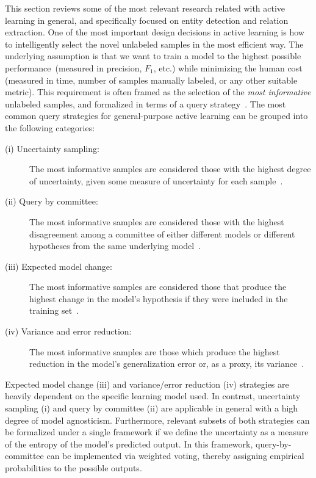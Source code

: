 This section reviews some of the most relevant research related with active learning in general, and specifically focused on entity detection and relation extraction.
One of the most important design decisions in active learning is how to intelligently select the novel unlabeled samples in the most efficient way. The underlying assumption is that we want to train a
model to the highest possible performance~(measured in precision, $F_1$, etc.) while minimizing the human cost (measured in time, number of samples manually labeled, or any other suitable metric).
This requirement is often framed as the selection of the \textit{most informative} unlabeled samples, and formalized in terms of a query strategy~\cite{survey}.
The most common query strategies for general-purpose active learning can be grouped into the following categories:

\begin{description}
\item[(i) Uncertainty sampling:] The most informative samples are considered those with the highest degree of uncertainty, given some measure of uncertainty for each sample~\cite{Lewis1994148}.

\item[(ii) Query by committee:] The most informative samples are considered those with the highest disagreement among a committee of either different models or different hypotheses from the same underlying model~\cite{seungquery}.

\item[(iii) Expected model change:] The most informative samples are considered those that produce the highest change in the model's hypothesis if they were included in the training set~\cite{NIPS2007_3252}.

\item[(iv) Variance and error reduction:] The most informative samples are those which produce the highest reduction in the model's generalization error or, as a proxy, its variance~\cite{roy2001toward}.
\end{description}

Expected model change (iii) and variance/error reduction (iv) strategies are heavily dependent on the specific learning model used.
In contrast, uncertainty sampling (i) and query by committee (ii) are  applicable in general with a high degree of model agnosticism.
Furthermore, relevant subsets of both strategies can be formalized under a single framework if we define the uncertainty as a measure of the entropy of the model's predicted output.
In this framework, query-by-committee can be implemented via weighted voting, thereby assigning empirical probabilities to the possible outputs.


